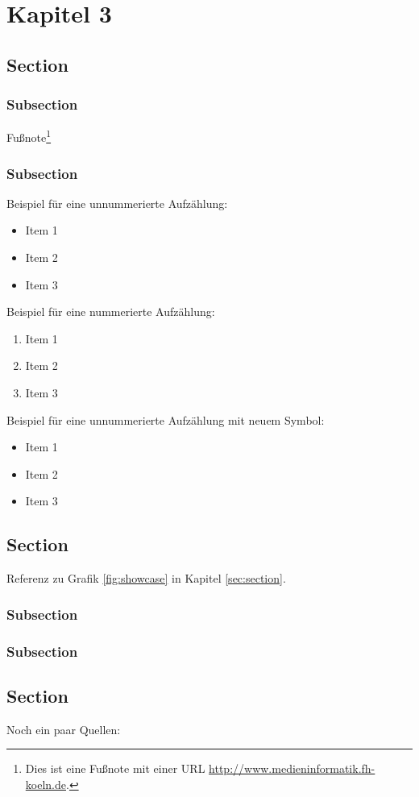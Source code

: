 \chapter{Kapitel 3}

\section{Section}

\subsection{Subsection}
Fußnote\footnote{Dies ist eine Fußnote mit einer URL \url{http://www.medieninformatik.fh-koeln.de}.}
  
\subsection{Subsection}
Beispiel für eine unnummerierte Aufzählung:
\begin{itemize}
	\item Item 1
	\item Item 2
	\item Item 3
\end{itemize}

\noindent{}Beispiel für eine nummerierte Aufzählung:
\begin{enumerate}
	\item Item 1
	\item Item 2
	\item Item 3
\end{enumerate}



\noindent{}Beispiel für eine unnummerierte Aufzählung mit neuem Symbol:
\begin{itemize}
\renewcommand{\labelitemi}{$\rightarrow$}
	\item Item 1
	\item Item 2
	\item Item 3
\end{itemize}

\section{Section}
Referenz zu Grafik \ref{fig:showcase} in Kapitel \ref{sec:section}.

\subsection{Subsection}

\subsection{Subsection}

\section{Section}
Noch ein paar Quellen: \cite{Yoshizawa} \cite{Pre94} \cite{W3C04}
